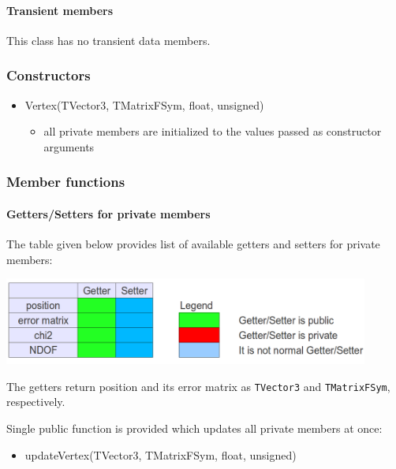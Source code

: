 \paragraph{Transient members} This class has no transient data members.

\subsubsection{Constructors}

\begin{itemize}
 \item {\bluett Vertex(TVector3, TMatrixFSym, float, unsigned)}
 \begin{itemize}
  \item all private members are initialized to the values passed as constructor arguments
 \end{itemize}
\end{itemize}

\subsubsection{Member functions}

\paragraph{Getters/Setters for private members}

The table given below provides list of available getters and setters for private members:
\begin{center}
 \includegraphics[width=0.9\textwidth]{DataModel/figs/vertexGetterSetter.png}
\end{center}
The getters return position and its error matrix as {\tt TVector3} and {\tt TMatrixFSym}, 
respectively. 

Single public function is provided which updates all private members at once:
\begin{itemize}
 \item {\bluett updateVertex(TVector3, TMatrixFSym, float, unsigned)}
\end{itemize}
